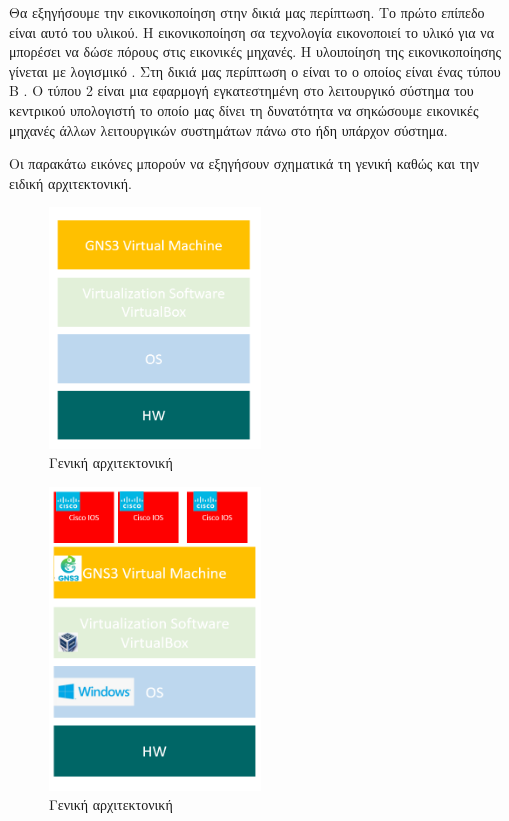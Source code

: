 Θα εξηγήσουμε την εικονικοποίηση στην δικιά μας περίπτωση. Το πρώτο επίπεδο είναι αυτό του υλικού. Η εικονικοποίηση
σα τεχνολογία εικονοποιεί το υλικό για να μπορέσει να δώσε πόρους στις εικονικές μηχανές. Η υλοιποίηση
της εικονικοποίησης γίνεται με λογισμικό . Στη δικιά μας περίπτωση ο  είναι 
το  ο οποίος είναι ένας τύπου Β . Ο  τύπου 2 είναι μια εφαρμογή εγκατεστημένη 
στο λειτουργικό σύστημα του κεντρικού υπολογιστή το οποίο μας δίνει τη δυνατότητα να σηκώσουμε 
εικονικές μηχανές άλλων λειτουργικών συστημάτων πάνω στο ήδη υπάρχον σύστημα.

Οι παρακάτω εικόνες μπορούν να εξηγήσουν σχηματικά τη γενική καθώς και την ειδική αρχιτεκτονική.

\begin{figure}[htb]
	\centering
	\includegraphics[width=0.5\textwidth]{graphics/Architecture_virtualbox.PNG}
	\caption{ Γενική αρχιτεκτονική}
\end{figure}

\begin{figure}[htb]
	\centering
	\includegraphics[width=0.5\textwidth]{graphics/virtualization_architecture.PNG}
	\caption{ Γενική αρχιτεκτονική}
\end{figure}

